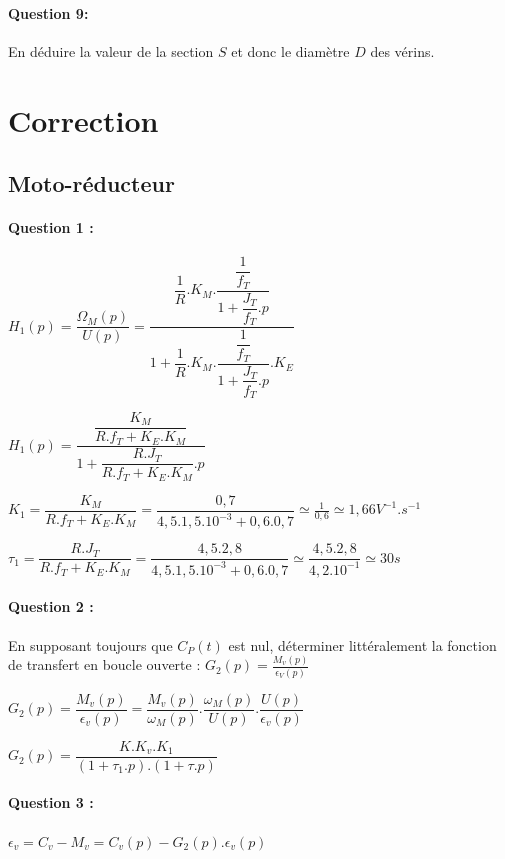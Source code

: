 \paragraph{Question 9:} En déduire la valeur de la section $S$ et donc le diamètre $D$ des vérins.

\ifdef{\public}{}{}

\newpage

\pagestyle{correction}

\section{Correction}

\subsection{Moto-réducteur}

\paragraph{Question 1 :} $H_1(p)=\dfrac{\Omega_M(p)}{U(p)}=\dfrac{\dfrac{1}{R}.K_M.\dfrac{\dfrac{1}{f_T}}{1+\dfrac{J_T}{f_T}.p}}{1+\dfrac{1}{R}.K_M.\dfrac{\dfrac{1}{f_T}}{1+\dfrac{J_T}{f_T}.p}.K_E}$

$H_1(p)=\dfrac{\dfrac{K_M}{R.f_T+K_E.K_M}}{1+\dfrac{R.J_T}{R.f_T+K_E.K_M}.p}$

$K_1=\dfrac{K_M}{R.f_T+K_E.K_M}=\dfrac{0,7}{4,5.1,5.10^{-3}+0,6.0,7}\simeq\frac{1}{0,6}\simeq1,66V^{-1}.s^{-1}$

$\tau_1=\dfrac{R.J_T}{R.f_T+K_E.K_M}=\dfrac{4,5.2,8}{4,5.1,5.10^{-3}+0,6.0,7}\simeq\dfrac{4,5.2,8}{4,2.10^{-1}}\simeq30s$

\paragraph{Question 2 :} En supposant toujours que $C_P(t)$ est nul, déterminer littéralement la fonction de transfert en boucle ouverte : $G_2(p)=\frac{M_v(p)}{\epsilon_V(p)}$	

$G_2(p)=\dfrac{M_v(p)}{\epsilon_v(p)}=\dfrac{M_v(p)}{\omega_M(p)}.\dfrac{\omega_M(p)}{U(p)}.\dfrac{U(p)}{\epsilon_v(p)}$

$G_2(p)=\dfrac{K.K_v.K_1}{(1+\tau_1.p).(1+\tau.p)}$

\paragraph{Question 3 :} $\epsilon_v=C_v-M_v=C_v(p)-G_2(p).\epsilon_v(p)$

